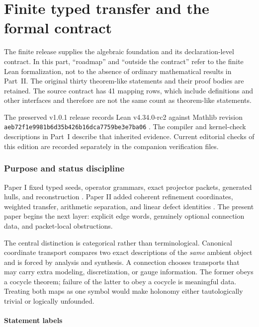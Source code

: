 \documentclass[11pt,a4paper]{article}
\theoremstyle{plain}
\theoremstyle{definition}
\theoremstyle{remark}
\newcommand{\leanname}[1]{\nolinkurl{#1}}
\begin{document}
\part{Finite typed transfer and the formal contract}\label{part:finite}
\noindent The finite release supplies the algebraic foundation and its declaration-level contract. In this part, ``roadmap'' and ``outside the contract'' refer to the finite Lean formalization, not to the absence of ordinary mathematical results in Part~II. The original thirty theorem-like statements and their proof bodies are retained. The source contract has 41 mapping rows, which include definitions and other interfaces and therefore are not the same count as theorem-like statements.

\medskip\noindent The preserved v1.0.1 release records Lean v4.34.0-rc2 against Mathlib revision \leanname{aeb72f1e9981b6d35b426b16dca7759be3e7ba06} \cite{lean,mathlib}. The compiler and kernel-check descriptions in Part~I describe that inherited evidence. Current editorial checks of this edition are recorded separately in the companion verification files.
\section{Purpose and status discipline}
\label{sec:purpose}

Paper I fixed typed seeds, operator grammars, exact projector packets,
generated hulls, and reconstruction \cite{paperI}.  Paper II added coherent
refinement coordinates, weighted transfer, arithmetic separation, and linear
defect identities \cite{paperII}.  The present paper begins the next layer:
explicit edge words, genuinely optional connection data, and packet-local
obstructions.

The central distinction is categorical rather than terminological.
Canonical coordinate transport compares two exact descriptions of the
\emph{same} ambient object and is forced by analysis and synthesis.  A
connection chooses transports that may carry extra modeling, discretization,
or gauge information.  The former obeys a cocycle theorem; failure of the
latter to obey a cocycle is meaningful data.  Treating both maps as one
symbol would make holonomy either tautologically trivial or logically
unfounded.

\subsection{Statement labels}
\end{document}
